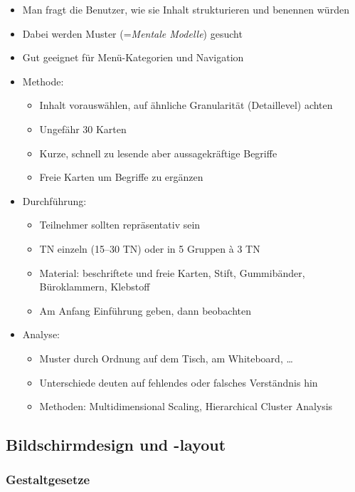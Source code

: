 \begin{itemize}
\item
  Man fragt die Benutzer, wie sie Inhalt strukturieren und benennen
  würden
\item
  Dabei werden Muster (=\emph{Mentale Modelle}) gesucht
\item
  Gut geeignet für Menü-Kategorien und Navigation
\item
  Methode:

  \begin{itemize}
  \item
    Inhalt vorauswählen, auf ähnliche Granularität (Detaillevel) achten
  \item
    Ungefähr 30 Karten
  \item
    Kurze, schnell zu lesende aber aussagekräftige Begriffe
  \item
    Freie Karten um Begriffe zu ergänzen
  \end{itemize}
\item
  Durchführung:

  \begin{itemize}
  \item
    Teilnehmer sollten repräsentativ sein
  \item
    TN einzeln (15--30 TN) oder in 5 Gruppen à 3 TN
  \item
    Material: beschriftete und freie Karten, Stift, Gummibänder,
    Büroklammern, Klebstoff
  \item
    Am Anfang Einführung geben, dann beobachten
  \end{itemize}
\item
  Analyse:

  \begin{itemize}
  \item
    Muster durch Ordnung auf dem Tisch, am Whiteboard, \ldots{}
  \item
    Unterschiede deuten auf fehlendes oder falsches Verständnis hin
  \item
    Methoden: Multidimensional Scaling, Hierarchical Cluster Analysis
  \end{itemize}
\end{itemize}

\subsection{Bildschirmdesign und -layout}

\subsubsection{Gestaltgesetze}

